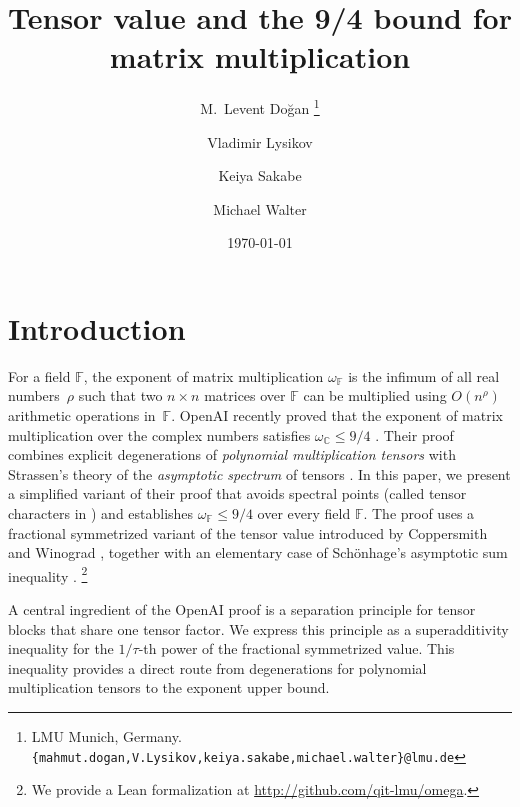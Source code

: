\documentclass[11pt,letterpaper]{article}
\title{Tensor value and the 9/4 bound for matrix multiplication}
\author{
M.\ Levent Do\u{g}an
\thanks{LMU Munich, Germany. \texttt{\{mahmut.dogan,V.Lysikov,keiya.sakabe,michael.walter\}@lmu.de} }
\and Vladimir Lysikov
\and Keiya Sakabe
\and Michael Walter
}
\date{\small\today}
\numberwithin{equation}{section}
\newcommand{\CC}{\mathbb{C}}
\newcommand{\FF}{\mathbb{F}}
\begin{document}
\maketitle


\section{Introduction}
For a field $\FF$, the exponent of matrix multiplication $\omega_{\FF}$ is the infimum of all real numbers~$\rho$ such that two $n\times n$ matrices over $\FF$ can be multiplied using $O(n^{\rho})$ arithmetic operations in~$\FF$.
OpenAI recently proved that the exponent of matrix multiplication over the complex numbers satisfies $\omega_{\CC}\leq 9/4$ \cite{chatgpt-paper}.
Their proof combines explicit degenerations of \emph{polynomial multiplication tensors} with Strassen's theory of the \emph{asymptotic spectrum} of tensors \cite{Strassen-86,Strassen-88}.
In this paper, we present a simplified variant of their proof that avoids spectral points (called tensor characters in \cite{chatgpt-paper}) and establishes $\omega_{\FF}\leq 9/4$ over every field $\FF$.
The proof uses a fractional symmetrized variant of the tensor value introduced by Coppersmith and Winograd \cite{CW-90}, together with an elementary case of Sch\"{o}nhage's asymptotic sum inequality \cite{schonhage}.%
\footnote{We provide a Lean formalization at \url{http://github.com/qit-lmu/omega}.}

A central ingredient of the OpenAI proof is a separation principle for tensor blocks that share one tensor factor.
We express this principle as a superadditivity inequality for the $1/\tau$-th power of the fractional symmetrized value.
This inequality provides a direct route from degenerations for polynomial multiplication tensors to the exponent upper bound.
\end{document}
